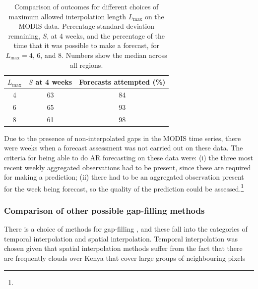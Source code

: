 \documentclass[review]{elsarticle}
\begin{document}
\begin{table}
	\caption{Comparison of outcomes for different choices of maximum allowed interpolation length $L_{\mathrm{max}}$ on the MODIS data. Percentage standard deviation remaining, $S$, at 4 weeks, and the percentage of the time that it was possible to make a forecast, for $L_{\mathrm{max}}=4$, 6, and 8. Numbers show the median across all regions.} \label{tab:IL choices}
	\centering
	\begin{tabular}{ccc} 
		\toprule
		\textbf{$L_{\mathrm{max}}$}    & \textbf{$S$ at 4 weeks}    & \textbf{Forecasts attempted (\%)}\\
		\midrule
		4  & 63 & 84 \\
		6  & 65 & 93 \\
		8 & 61 & 98 \\
		\bottomrule
	\end{tabular}
\end{table}

Due to the presence of non-interpolated gaps in the MODIS time series, there were weeks when a forecast assessment was not carried out on these data. The criteria for being able to do AR forecasting on these data were: (i) the three most recent weekly aggregated observations had to be present, since these are required for making a prediction; (ii) there had to be an aggregated observation present for the week being forecast, so the quality of the prediction could be assessed.\footnote{}


\subsubsection{Comparison of other possible gap-filling methods} \label{sec:compare}
{\color{red}There is a choice of methods for gap-filling \citep{bg-10-4055-2013, Weiss2014}, and these fall into the categories of temporal interpolation and spatial interpolation.} Temporal interpolation was chosen given that spatial interpolation methods suffer from the fact that there are frequently clouds over Kenya that cover large groups of neighbouring pixels 
\end{document}
